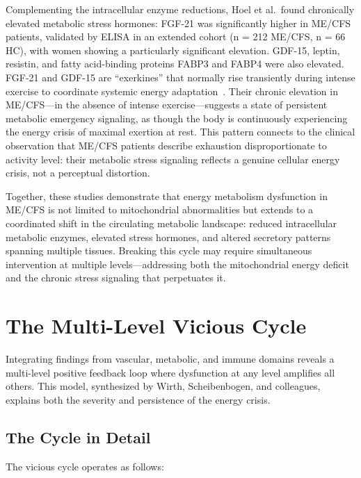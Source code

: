 Complementing the intracellular enzyme reductions, Hoel et al.\ found chronically elevated metabolic stress hormones: FGF-21 was significantly higher in ME/CFS patients, validated by ELISA in an extended cohort (n = 212 ME/CFS, n = 66 HC), with women showing a particularly significant elevation. GDF-15, leptin, resistin, and fatty acid-binding proteins FABP3 and FABP4 were also elevated. FGF-21 and GDF-15 are ``exerkines'' that normally rise transiently during intense exercise to coordinate systemic energy adaptation~\cite{Hoel2026proteome}. Their chronic elevation in ME/CFS---in the absence of intense exercise---suggests a state of persistent metabolic emergency signaling, as though the body is continuously experiencing the energy crisis of maximal exertion at rest. This pattern connects to the clinical observation that ME/CFS patients describe exhaustion disproportionate to activity level: their metabolic stress signaling reflects a genuine cellular energy crisis, not a perceptual distortion.

Together, these studies demonstrate that energy metabolism dysfunction in ME/CFS is not limited to mitochondrial abnormalities but extends to a coordinated shift in the circulating metabolic landscape: reduced intracellular metabolic enzymes, elevated stress hormones, and altered secretory patterns spanning multiple tissues. Breaking this cycle may require simultaneous intervention at multiple levels---addressing both the mitochondrial energy deficit and the chronic stress signaling that perpetuates it.

\section{The Multi-Level Vicious Cycle}
\label{sec:vicious-cycle}

Integrating findings from vascular, metabolic, and immune domains reveals a multi-level positive feedback loop where dysfunction at any level amplifies all others. This model, synthesized by Wirth, Scheibenbogen, and colleagues, explains both the severity and persistence of the energy crisis.

\subsection{The Cycle in Detail}

The vicious cycle operates as follows:

